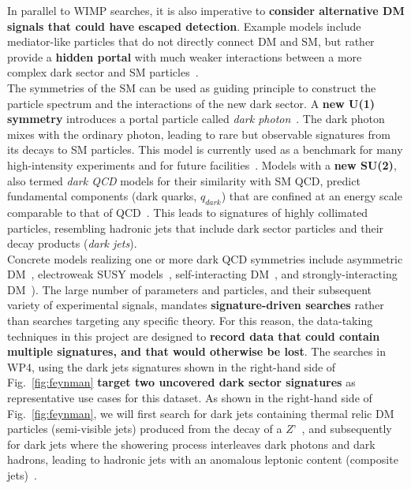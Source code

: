 In parallel to WIMP searches, it is also imperative to \textbf{consider alternative DM signals that could have escaped detection}. 
Example models include mediator-like particles that do not directly connect DM and SM, but rather provide a \textbf{hidden portal} with much weaker interactions between a more complex dark sector and SM particles~\cite{Strassler:2006im}. 
\\
The symmetries of the SM can be used as guiding principle to construct the particle spectrum and the interactions of the new dark sector. 
A \textbf{new U(1) symmetry} introduces a portal particle called \textit{dark photon}~\cite{Holdom:1985ag,Curtin:2014cca}.   
The dark photon mixes with the ordinary photon, leading to rare but observable signatures from its decays to SM particles. 
This model is currently used as a benchmark for many high-intensity experiments and for future facilities~\cite{Strategy:2019vxc}. 
Models with a \textbf{new SU(2)}, also termed \textit{dark QCD} models for their similarity with SM QCD, predict fundamental components (dark quarks, $q_{dark}$) that are confined at an energy scale comparable to that of QCD~\cite{Bai:2013xga}. 
This leads to signatures of highly collimated particles, resembling hadronic jets that include dark sector particles and their decay products (\textit{dark jets}). 
\\
Concrete models realizing one or more dark QCD symmetries include asymmetric DM~\cite{Zurek:2013wia}, electroweak SUSY models~\cite{Cheung:2009su}, self-interacting DM~\cite{Tulin:2017ara}, and strongly-interacting DM~\cite{Bernreuther:2019pfb}). 
The large number of parameters and particles, and their subsequent variety of experimental signals, mandates \textbf{signature-driven searches} rather than searches targeting any specific theory. 
For this reason, the data-taking techniques in this project are designed to \textbf{record data that could contain multiple signatures, and that would otherwise be lost}. The searches in WP4, using the dark jets signatures shown in the right-hand side of Fig.~\ref{fig:feynman} \textbf{target two uncovered dark sector signatures} as representative use cases for this dataset. As shown in the right-hand side of Fig.~\ref{fig:feynman}, we will first search for dark jets containing thermal relic DM particles (semi-visible jets) produced from the decay of a $Z’$~\cite{Bernreuther:2019pfb,Cohen:2017pzm}, and subsequently for dark jets where the showering process interleaves dark photons and dark hadrons, leading to hadronic jets with an anomalous leptonic content (composite jets)~\cite{Cheung:2009su,Park:2017rfb}.
%

